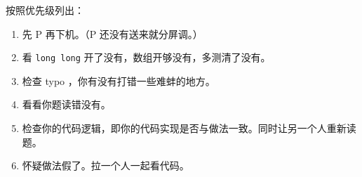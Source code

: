 按照优先级列出：
\begin{enumerate}
    \item 先 P 再下机。（P 还没有送来就分屏调。）
    \item 看 \verb|long long| 开了没有，数组开够没有，多测清了没有。
    \item 检查 typo ，你有没有打错一些难蚌的地方。
    \item 看看你题读错没有。
    \item 检查你的代码逻辑，即你的代码实现是否与做法一致。同时让另一个人重新读题。
    \item 怀疑做法假了。拉一个人一起看代码。
\end{enumerate}